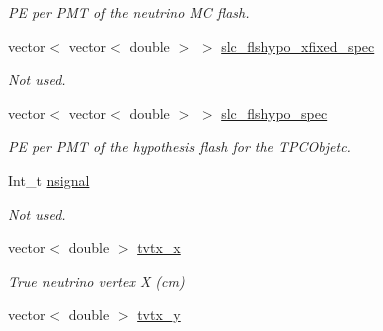 \begin{DoxyCompactItemize}
\begin{DoxyCompactList}\small\item\em P\-E per P\-M\-T of the neutrino M\-C flash. \end{DoxyCompactList}\item 
\hypertarget{classUBXSecEvent_aff42f5975ca8b7c22f21023ffe8cf2c9}{vector$<$ vector$<$ double $>$ $>$ \hyperlink{classUBXSecEvent_aff42f5975ca8b7c22f21023ffe8cf2c9}{slc\-\_\-flshypo\-\_\-xfixed\-\_\-spec}}\label{classUBXSecEvent_aff42f5975ca8b7c22f21023ffe8cf2c9}

\begin{DoxyCompactList}\small\item\em Not used. \end{DoxyCompactList}\item 
\hypertarget{classUBXSecEvent_aa82aa9b73994eae31d0f7ab0f47f23fa}{vector$<$ vector$<$ double $>$ $>$ \hyperlink{classUBXSecEvent_aa82aa9b73994eae31d0f7ab0f47f23fa}{slc\-\_\-flshypo\-\_\-spec}}\label{classUBXSecEvent_aa82aa9b73994eae31d0f7ab0f47f23fa}

\begin{DoxyCompactList}\small\item\em P\-E per P\-M\-T of the hypothesis flash for the T\-P\-C\-Objetc. \end{DoxyCompactList}\item 
\hypertarget{classUBXSecEvent_a6aff7f0ac0e26d4b80b117cb5797f1ab}{Int\-\_\-t \hyperlink{classUBXSecEvent_a6aff7f0ac0e26d4b80b117cb5797f1ab}{nsignal}}\label{classUBXSecEvent_a6aff7f0ac0e26d4b80b117cb5797f1ab}

\begin{DoxyCompactList}\small\item\em Not used. \end{DoxyCompactList}\item 
\hypertarget{classUBXSecEvent_a75b4a2318b7f7f187acdc33622a4795e}{vector$<$ double $>$ \hyperlink{classUBXSecEvent_a75b4a2318b7f7f187acdc33622a4795e}{tvtx\-\_\-x}}\label{classUBXSecEvent_a75b4a2318b7f7f187acdc33622a4795e}

\begin{DoxyCompactList}\small\item\em True neutrino vertex X (cm) \end{DoxyCompactList}\item 
\hypertarget{classUBXSecEvent_aa6532549e8c9763ae285a98976a80a94}{vector$<$ double $>$ \hyperlink{classUBXSecEvent_aa6532549e8c9763ae285a98976a80a94}{tvtx\-\_\-y}}\label{classUBXSecEvent_aa6532549e8c9763ae285a98976a80a94}


\end{DoxyCompactItemize}
